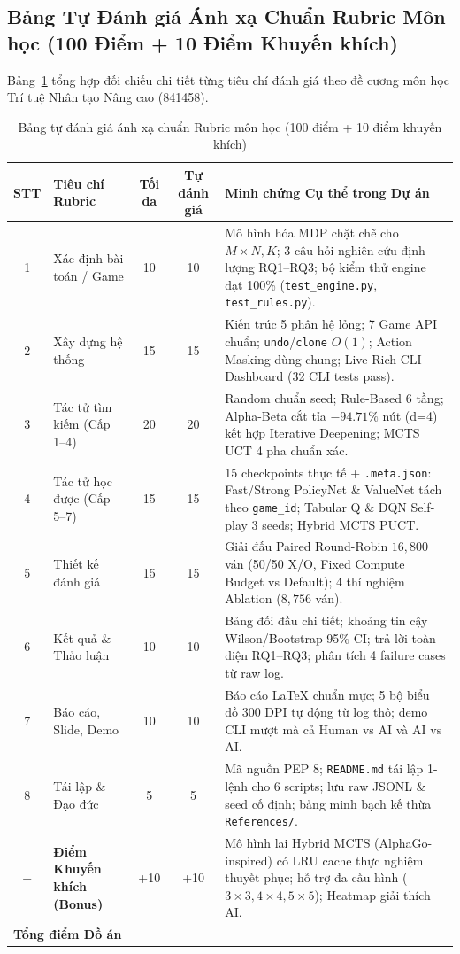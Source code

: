 \documentclass[a4paper,12pt]{report}
\begin{document}
\subsection{Bảng Tự Đánh giá Ánh xạ Chuẩn Rubric Môn học (100 Điểm + 10 Điểm Khuyến khích)}
Bảng~\ref{tab:rubric} tổng hợp đối chiếu chi tiết từng tiêu chí đánh giá theo đề cương môn học Trí tuệ Nhân tạo Nâng cao (841458).

\begin{table}[H]
\centering
\footnotesize
\setlength{\tabcolsep}{4pt}
\caption{Bảng tự đánh giá ánh xạ chuẩn Rubric môn học (100 điểm + 10 điểm khuyến khích)}
\label{tab:rubric}
\vspace{0.2cm}
\begin{tabular}{cp{3.1cm}ccp{7.3cm}}
\toprule
\textbf{STT} & \textbf{Tiêu chí Rubric} & \textbf{Tối đa} & \textbf{Tự đánh giá} & \textbf{Minh chứng Cụ thể trong Dự án} \\
\midrule
1 & Xác định bài toán / Game & 10 & 10 & Mô hình hóa MDP chặt chẽ cho $M \times N, K$; 3 câu hỏi nghiên cứu định lượng RQ1--RQ3; bộ kiểm thử engine đạt 100\% (\texttt{test\_\allowbreak engine.py}, \texttt{test\_\allowbreak rules.py}). \\
2 & Xây dựng hệ thống & 15 & 15 & Kiến trúc 5 phân hệ lỏng; 7 Game API chuẩn; \texttt{undo}/\texttt{clone} $O(1)$; Action Masking dùng chung; Live Rich CLI Dashboard (32 CLI tests pass). \\
3 & Tác tử tìm kiếm (Cấp 1--4) & 20 & 20 & Random chuẩn seed; Rule-Based 6 tầng; Alpha-Beta cắt tỉa $-94.71\%$ nút (d=4) kết hợp Iterative Deepening; MCTS UCT 4 pha chuẩn xác. \\
4 & Tác tử học được (Cấp 5--7) & 15 & 15 & 15 checkpoints thực tế + \texttt{.meta.json}: Fast/Strong PolicyNet \& ValueNet tách theo \texttt{game\_\allowbreak id}; Tabular Q \& DQN Self-play 3 seeds; Hybrid MCTS PUCT. \\
5 & Thiết kế đánh giá & 15 & 15 & Giải đấu Paired Round-Robin $16{,}800$ ván (50/50 X/O, Fixed Compute Budget vs Default); 4 thí nghiệm Ablation ($8{,}756$ ván). \\
6 & Kết quả \& Thảo luận & 10 & 10 & Bảng đối đầu chi tiết; khoảng tin cậy Wilson/Bootstrap 95\% CI; trả lời toàn diện RQ1--RQ3; phân tích 4 failure cases từ raw log. \\
7 & Báo cáo, Slide, Demo & 10 & 10 & Báo cáo LaTeX chuẩn mực; 5 bộ biểu đồ $300\text{ DPI}$ tự động từ log thô; demo CLI mượt mà cả Human vs AI và AI vs AI. \\
8 & Tái lập \& Đạo đức & 5 & 5 & Mã nguồn PEP 8; \texttt{README.md} tái lập 1-lệnh cho 6 scripts; lưu raw JSONL \& seed cố định; bảng minh bạch kế thừa \texttt{References/}. \\
\midrule
+ & \textbf{Điểm Khuyến khích (Bonus)} & +10 & +10 & Mô hình lai Hybrid MCTS (AlphaGo-inspired) có LRU cache thực nghiệm thuyết phục; hỗ trợ đa cấu hình ($3\times 3, 4\times 4, 5\times 5$); Heatmap giải thích AI. \\
\midrule
\multicolumn{2}{l}{\textbf{Tổng điểm Đồ án}} & \textbf{} & \textbf{} & \textbf{} \\
\bottomrule
\end{tabular}
\end{table}
\end{document}

